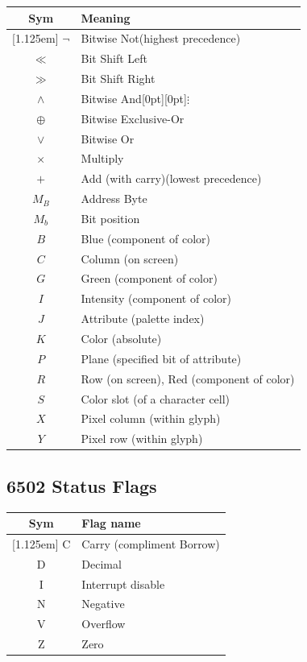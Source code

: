 \documentclass[12pt]{{memoir}}
\newcommand\Hline{%
\hline\raisebox{0pt}[1.125em]{}}
\begin{document}
\begin{center}\begin{tabular}{cl}
Sym & Meaning \\
\Hline
$\lnot{}$ & Bitwise Not\hspace{\stretch{1}}(highest precedence) \\
$\ll$ & Bit Shift Left \\
$\gg$ & Bit Shift Right \\
$\wedge$ & Bitwise And\hspace{\stretch{2}}\raisebox{-.633em}[0pt][0pt]{$\vdots$}\hspace*{\stretch{1}}\\
$\oplus$ & Bitwise Exclusive-Or \\
$\vee$ & Bitwise Or \\
$\times$ & Multiply \\
$+$ & Add (with carry)\hspace{\stretch{1}}(lowest precedence) \\
$M_B$ & Address Byte \\
$M_b$ & Bit position \\
$B$ & Blue (component of color) \\
$C$ & Column (on screen) \\
$G$ & Green (component of color) \\
$I$ & Intensity (component of color) \\
$J$ & Attribute (palette index) \\
$K$ & Color (absolute) \\
$P$ & Plane (specified bit of attribute) \\
$R$ & Row (on screen), Red (component of color) \\
$S$ & Color slot (of a character cell) \\
$X$ & Pixel column (within glyph) \\
$Y$ & Pixel row (within glyph) \\
\end{tabular}\end{center}

\subsection{6502 Status Flags}

\begin{center}\begin{tabular}{cl}
Sym & Flag name \\
\Hline
C & Carry (compliment Borrow) \\
D & Decimal \\
I & Interrupt disable \\
N & Negative \\
V & Overflow \\
Z & Zero \\
\end{tabular}\end{center}
\end{document}
